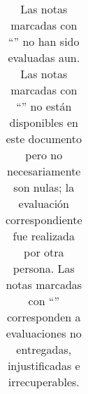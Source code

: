 \documentclass[]{article}
\begin{document}
\begin{table}[h!]
\begin{center}
\begin{tabular}{ | r | l | l | r | r | r | r | r | r | r | }
                \hline
        \end{tabular}
        \caption*{Las notas marcadas con “\NoX” no han sido evaluadas aun.  Las notas marcadas con “\NoN” no están disponibles en este documento pero no necesariamente son nulas; la evaluación correspondiente fue realizada por otra persona.  Las notas marcadas con “\NoE” corresponden a evaluaciones no entregadas, injustificadas e irrecuperables.}
        \end{center}
        \end{table}
\end{document}
